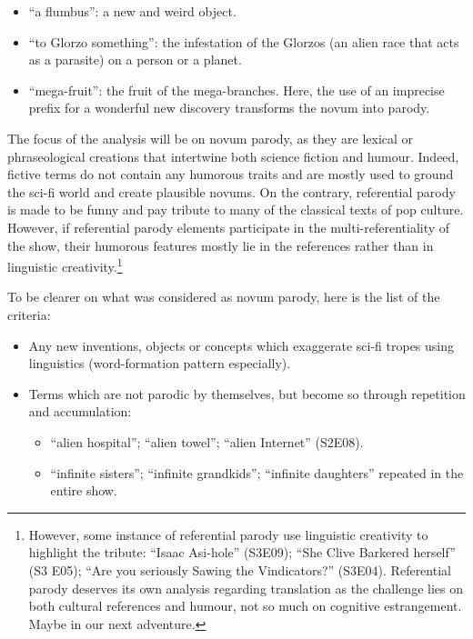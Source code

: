 \documentclass[output=paper]{langscibook}
\begin{document}
\begin{itemize}
\begin{itemize}
\item “a flumbus”: a new and weird object.
\item “to Glorzo something”: the infestation of the Glorzos (an alien race that acts as a parasite) on a person or a planet.
\item “mega-fruit”: the fruit of the mega-branches. Here, the use of an imprecise prefix for a wonderful new discovery transforms the novum into parody.
\end{itemize}
\end{itemize}

The focus of the analysis will be on novum parody, as they are lexical or phraseological creations that intertwine both science fiction and humour. Indeed, fictive terms do not contain any humorous traits and are mostly used to ground the sci-fi world and create plausible novums. On the contrary, referential parody is made to be funny and pay tribute to many of the classical texts of pop culture. However, if referential parody elements participate in the multi-referentiality of the show, their humorous features mostly lie in the references rather than in linguistic creativity.\footnote{However, some instance of referential parody use linguistic creativity to highlight the tribute: “Isaac Asi-hole” (S3E09); “She Clive Barkered herself” (S3 E05); “Are you seriously Sawing the Vindicators?” (S3E04). Referential parody deserves its own analysis regarding translation as the challenge lies on both cultural references and humour, not so much on cognitive estrangement. Maybe in our next adventure.}

To be clearer on what was considered as novum parody, here is the list of the criteria:

\begin{itemize}
\item Any new inventions, objects or concepts which exaggerate sci-fi tropes using linguistics (word-formation pattern especially).
\item Terms which are not parodic by themselves, but become so through repetition and accumulation:

\begin{itemize}
\item “alien hospital”; “alien towel”; “alien Internet” (S2E08).
\item “infinite sisters”; “infinite grandkids”; “infinite daughters” repeated in the entire show.
\end{itemize}
\end{itemize}
\end{document}
